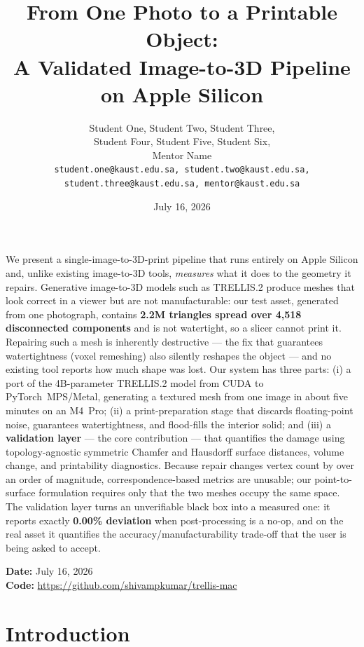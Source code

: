 \documentclass[11pt,a4paper]{article}
\title{\vspace{-1.5cm}\color{kanavy}\bfseries From One Photo to a Printable Object:\\
A Validated Image-to-3D Pipeline on Apple Silicon}
\author{%
  Student One, Student Two, Student Three,\\
  Student Four, Student Five, Student Six,\\
  Mentor Name\\[0.3em]
  \small\texttt{student.one@kaust.edu.sa, student.two@kaust.edu.sa,}\\
  \small\texttt{student.three@kaust.edu.sa, mentor@kaust.edu.sa}
}
\date{July 16, 2026}
\begin{document}
\maketitle

\begin{tcolorbox}[colframe=kanavy,colback=white,arc=3mm,title={\bfseries\color{white}Abstract}]
We present a single-image-to-3D-print pipeline that runs entirely on Apple
Silicon and, unlike existing image-to-3D tools, \emph{measures} what it does to
the geometry it repairs. Generative image-to-3D models such as TRELLIS.2
produce meshes that look correct in a viewer but are not manufacturable: our
test asset, generated from one photograph, contains \textbf{2.2M triangles
spread over 4{,}518 disconnected components} and is not watertight, so a slicer
cannot print it. Repairing such a mesh is inherently destructive --- the fix
that guarantees watertightness (voxel remeshing) also silently reshapes the
object --- and no existing tool reports how much shape was lost. Our system has
three parts: (i) a port of the 4B-parameter TRELLIS.2 model from CUDA to
PyTorch~MPS/Metal, generating a textured mesh from one image in about five
minutes on an M4~Pro; (ii) a print-preparation stage that discards
floating-point noise, guarantees watertightness, and flood-fills the interior
solid; and (iii) a \textbf{validation layer} --- the core contribution --- that
quantifies the damage using topology-agnostic symmetric Chamfer and Hausdorff
surface distances, volume change, and printability diagnostics. Because repair
changes vertex count by over an order of magnitude, correspondence-based
metrics are unusable; our point-to-surface formulation requires only that the
two meshes occupy the same space. The validation layer turns an unverifiable
black box into a measured one: it reports exactly \textbf{0.00\% deviation}
when post-processing is a no-op, and on the real asset it quantifies the
accuracy/manufacturability trade-off that the user is being asked to accept.
\end{tcolorbox}

\vspace{0.5em}
\noindent\textbf{Date:} July 16, 2026\\
\textbf{Code:} \url{https://github.com/shivampkumar/trellis-mac}

\tableofcontents
\newpage

\section{Introduction}
\end{document}
